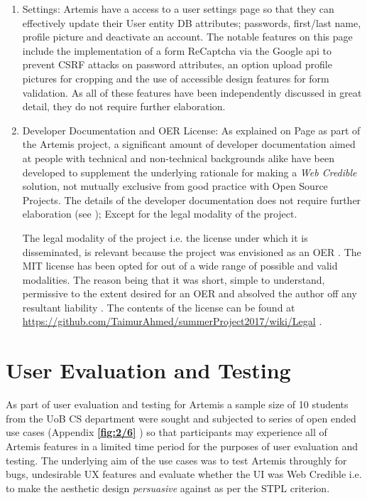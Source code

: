 \begin{enumerate}
    
    \item Settings: Artemis have a access to a user settings page so that they can effectively update their User entity DB attributes; passwords, first/last name, profile picture and deactivate an account. The notable features on this page include the implementation of a form ReCaptcha via the Google api to prevent CSRF attacks on password attributes, an option upload profile pictures for cropping and the use of accessible design features for form validation. As all of these features have been independently discussed in great detail, they do not require further elaboration.
    
    \item Developer Documentation and OER License: As explained on Page \textbf{\pageref{wiki}} as part of the Artemis project, a significant amount of developer documentation aimed at people with technical and non-technical backgrounds alike have been developed to supplement the underlying rationale for making a \textit{Web Credible} solution, not mutually exclusive from good practice with Open Source Projects.  The details of the developer documentation does not require further elaboration (see \pageref{developer}); Except for the legal modality of the project.
    
    The legal modality of the project i.e. the license under which it is disseminated, is relevant because the project was envisioned as an OER \cite{UNESCO}. The MIT license \cite{Github} has been opted for out of a wide range of possible and valid modalities. The reason being that it was short, simple to understand, permissive to the extent desired for an OER \cite{UNESCO} and absolved the author off any resultant liability \cite{Github}. The contents of the license can be found at \url{https://github.com/TaimurAhmed/summerProject2017/wiki/Legal} .
    
    
    
    
\end{enumerate}


\section{User Evaluation and Testing}

    As part of user evaluation and testing for Artemis a sample size of 10 students from the UoB CS department were sought and subjected to series of open ended use cases (Appendix \textbf{\ref{fig:2/6}} ) so that participants may experience all of Artemis features in a limited time period for the purposes of user evaluation and testing. The underlying aim of the use cases was to test Artemis throughly for bugs, undesirable UX features and evaluate whether the UI was Web Credible i.e. to make the aesthetic design \textit{persuasive} against as per the STPL criterion.
    
